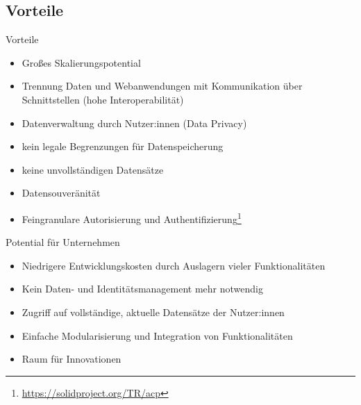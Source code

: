 \documentclass{beamer}              %
\begin{document}
\subsection{Vorteile}
\begin{frame}{Vorteile}
\begin{itemize}
    \item Großes Skalierungspotential \cite{8633673}
    \item Trennung Daten und Webanwendungen mit Kommunikation über Schnittstellen (hohe Interoperabilität)\cite{8633673}
    \item Datenverwaltung durch Nutzer:innen (Data Privacy) \cite{yeung2023decentralization} 
    \item kein legale Begrenzungen für Datenspeicherung \cite{MarcoNeumann.2021}
    \item keine unvollständigen Datensätze\cite{MarcoNeumann.2021}
    \item Datensouveränität
    \item Feingranulare Autorisierung und Authentifizierung\footnote{\url{https://solidproject.org/TR/acp}}
\end{itemize}
\end{frame}

\begin{frame}{Potential für Unternehmen}
\begin{itemize}
    \item Niedrigere Entwicklungskosten durch Auslagern vieler Funktionalitäten 
    \item Kein Daten- und Identitätsmanagement mehr notwendig
    \item Zugriff auf vollständige, aktuelle Datensätze der Nutzer:innen \cite{MarcoNeumann.2021}
    \item Einfache Modularisierung und Integration von Funktionalitäten
    \item Raum für Innovationen \cite{MarcoNeumann.2021}
\end{itemize}
\end{frame}
\end{document}
